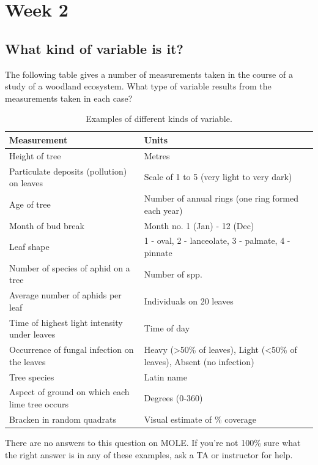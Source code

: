 \documentclass[]{book}
\begin{document}
\section{Week 2}\label{week-2}

\subsection{What kind of variable is
it?}\label{what-kind-of-variable-is-it}

The following table gives a number of measurements taken in the course
of a study of a woodland ecosystem. What type of variable results from
the measurements taken in each case?

\begin{table}

\caption{\label{tab:unnamed-chunk-64}Examples of different kinds of variable.}
\centering
\begin{tabular}[t]{ll}
\toprule
Measurement & Units\\
\midrule
Height of tree & Metres\\
Particulate deposits (pollution) on leaves & Scale of 1 to 5 (very light to very dark)\\
Age of tree & Number of annual rings (one ring formed each year)\\
Month of bud break & Month no. 1 (Jan) - 12 (Dec)\\
Leaf shape & 1 - oval, 2 - lanceolate, 3 - palmate, 4 - pinnate\\
\addlinespace
Number of species of aphid on a tree & Number of spp.\\
Average number of aphids per leaf & Individuals on 20 leaves\\
Time of highest light intensity under leaves & Time of day\\
Occurrence of fungal infection on the leaves & Heavy (>50\% of leaves), Light (<50\% of leaves), Absent (no infection)\\
Tree species & Latin name\\
\addlinespace
Aspect of ground on which each lime tree occurs & Degrees (0-360)\\
Bracken in random quadrats & Visual estimate of \% coverage\\
\bottomrule
\end{tabular}
\end{table}

There are no answers to this question on MOLE. If you're not 100\% sure
what the right answer is in any of these examples, ask a TA or
instructor for help.
\end{document}
